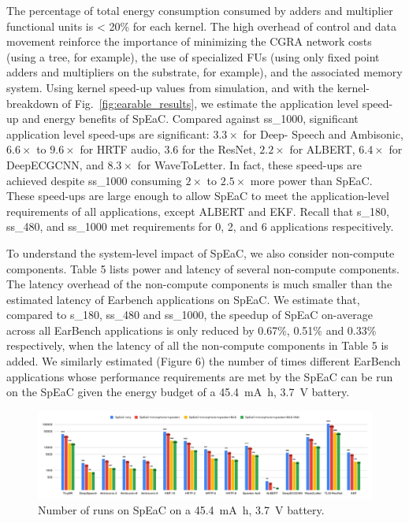 The percentage of total energy consumption consumed by adders and multiplier
functional units is < 20\% for each kernel. The high overhead of control and
data movement reinforce the importance of minimizing the CGRA network costs
(using a tree, for example), the use of specialized FUs (using only fixed point
adders and multipliers on the substrate, for example), and the associated
memory system. Using kernel speed-up values from simulation, and with the
kernel-breakdown of Fig.~\ref{fig:earable_results}, we estimate the application
level speed-up and energy benefits of SpEaC. Compared against ss\_1000,
significant application level speed-ups are significant: \(3.3\times\) for
Deep- Speech and Ambisonic, \(6.6\times\) to \(9.6\times\) for HRTF audio,
\(3.6\) for the ResNet, \(2.2\times\) for ALBERT, \(6.4\times\) for DeepECGCNN,
and \(8.3\times\) for WaveToLetter. In fact, these speed-ups are achieved
despite ss\_1000 consuming \(2\times\) to \(2.5\times\) more power than SpEaC.
These speed-ups are large enough to allow SpEaC to meet the application-level
requirements of all applications, except ALBERT and EKF. Recall
that s\_180, ss\_480, and ss\_1000 met requirements for 0, 2, and 6 applications
respecitively.

To understand the system-level impact of SpEaC, we also consider non-compute
components. Table 5 lists power and latency of several non-compute components.
The latency overhead of the non-compute components is much smaller than the
estimated latency of Earbench applications on SpEaC. We estimate that, compared
to s\_180, ss\_480 and ss\_1000, the speedup of SpEaC on-average across all
EarBench applications is only reduced by 0.67\%, 0.51\% and 0.33\% respectively,
when the latency of all the non-compute components in Table 5 is added. We
similarly estimated (Figure 6) the number of times different EarBench
applications whose performance requirements are met by the SpEaC can be run on
the SpEaC given the energy budget of a \SI{45.4}{\milli\ampere\hour},
\SI{3.7}{\volt} battery.


\begin{figure}
    \centering
    \includegraphics[width=\linewidth]{./figs/speakandsensors.png}
    \caption{\small
    Number of runs on SpEaC on a \SI{45.4}{\milli\ampere\hour}, \SI{3.7}{\volt}
    battery.
    }
    \label{fig:earable_edp}
\end{figure}

